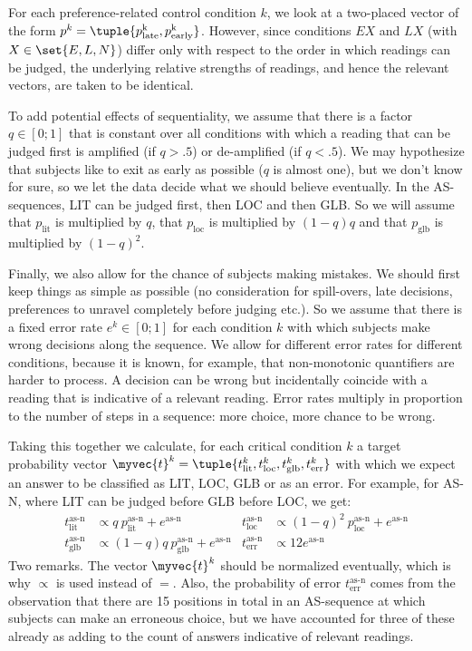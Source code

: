\documentclass[fleqn,reqno,10pt]{article}
\begin{document}
For each preference-related control condition $k$, we look at a
two-placed vector of the form $p^k =
\tuple{p^{\text{k}}_{\text{late}},
  p^{\text{k}}_{\text{early}}}$. However, since conditions $EX$ and
$LX$ (with $X \in \set{E,L,N}$) differ only with respect to the order
in which readings can be judged, the underlying relative strengths of
readings, and hence the relevant vectors, are taken to be identical.

To add potential effects of sequentiality, we assume that there is a
factor $q \in [0;1]$ that is constant over all conditions with which a
reading that can be judged first is amplified (if $q > .5$) or
de-amplified (if $q <.5$). We may hypothesize that subjects like to
exit as early as possible ($q$ is almost one), but we don't know for
sure, so we let the data decide what we should believe eventually. In
the AS-sequences, LIT can be judged first, then LOC and then GLB. So
we will assume that $p_{\text{lit}}$ is multiplied by $q$, that
$p_{\text{loc}}$ is multiplied by $(1-q)q$ and that $p_{\text{glb}}$
is multiplied by $(1-q)^2$.

Finally, we also allow for the chance of subjects making mistakes. We
should first keep things as simple as possible (no consideration for
spill-overs, late decisions, preferences to unravel completely before
judging etc.). So we assume that there is a fixed error rate $e^k \in
[0;1]$ for each condition $k$ with which subjects make wrong decisions
along the sequence. We allow for different error rates for different
conditions, because it is known, for example, that non-monotonic
quantifiers are harder to process. A decision can be wrong but
incidentally coincide with a reading that is indicative of a relevant
reading. Error rates multiply in proportion to the number of steps in
a sequence: more choice, more chance to be wrong.

Taking this together we calculate, for each critical condition $k$ a
target probability vector $\myvec{t}^k =
\tuple{t^k_{\text{lit}},t^k_{\text{loc}},t^k_{\text{glb}},t^k_{\text{err}}}$
with which we expect an answer to be classified as LIT, LOC, GLB or as
an error. For example, for AS-N, where LIT can be judged before GLB
before LOC, we get:
\begin{align*}
  t^{\text{as-n}}_{\text{lit}} & \propto q \
  p^\text{as-n}_{\text{lit}} + e^\text{as-n} &   t^{\text{as-n}}_{\text{loc}} & \propto (1-q)^2 \
  p^\text{as-n}_{\text{loc}} + e^\text{as-n} \\
  t^{\text{as-n}}_{\text{glb}} & \propto (1-q)q \
  p^\text{as-n}_{\text{glb}} + e^\text{as-n} &   t^{\text{as-n}}_{\text{err}} &
  \propto 12 e^\text{as-n}
\end{align*}
Two remarks. The vector $\myvec{t}^k$ should be normalized eventually,
which is why $\propto$ is used instead of $=$. Also, the probability
of error $t^{\text{as-n}}_{\text{err}}$ comes from the observation
that there are 15 positions in total in an AS-sequence at which
subjects can make an erroneous choice, but we have accounted for three
of these already as adding to the count of answers indicative of
relevant readings.
\end{document}
